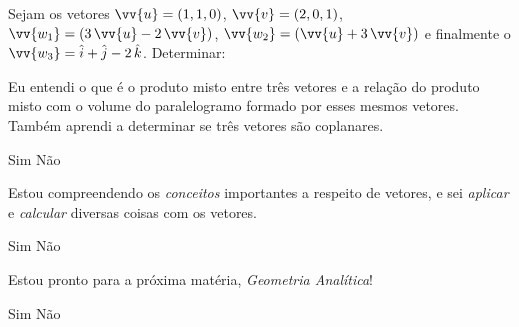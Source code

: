 \documentclass[pdftex, brazil, 12pt, oneside, addpoints]{exam}
\newcommand{\vetor}[1]{\ensuremath{\vv{#1}}}
\newcommand{\vetori}{\ensuremath{\hat{i}}}
\newcommand{\vetorj}{\ensuremath{\hat{j}}}
\newcommand{\vetork}{\ensuremath{\hat{k}}}
\begin{document}
\begin{questions}
\question
Sejam os vetores $\vetor{u} = (1, 1, 0)$, $\vetor{v} = (2, 0, 1)$,
$\vetor{w_1} = (3\,\vetor{u} - 2\,\vetor{v})$, $\vetor{w_2} =
(\vetor{u} + 3\,\vetor{v})$ e finalmente o $\vetor{w_3} = \vetori + \vetorj -
2\,\vetork$. Determinar:

\question
Eu entendi o que é o produto misto entre três vetores e a relação do
produto misto com o volume do paralelogramo formado por esses mesmos
vetores. Também aprendi a determinar se três vetores são coplanares.
\begin{checkboxes}
  \choice Sim
  \choice Não
\end{checkboxes}


\newpage

\question
Estou compreendendo os \emph{conceitos} importantes a respeito de
vetores, e sei \emph{aplicar} e \emph{calcular} diversas coisas com os
vetores.
\begin{checkboxes}
  \choice Sim
  \choice Não
\end{checkboxes}

\question
Estou pronto para a próxima matéria, \emph{Geometria Analítica}!
\begin{checkboxes}
  \choice Sim
  \choice Não
\end{checkboxes}



\end{questions}
\end{document}
